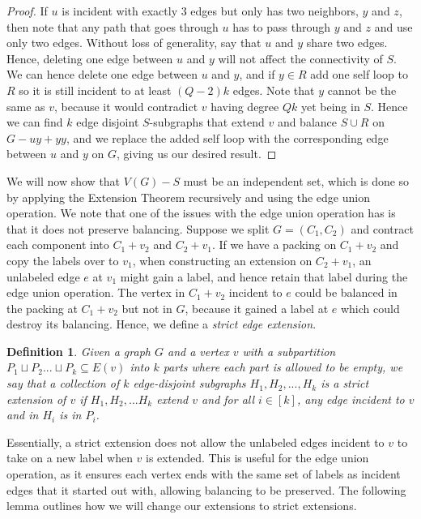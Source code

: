\documentclass{article}
\newtheorem{definition}{Definition}[section]
\begin{document}
\begin{proof}
    If $u$ is incident with exactly 3 edges but only has two neighbors, $y$ and $z$, then note that any path that goes through $u$ has to pass through $y$ and $z$ and use only two edges. Without loss of generality, say that $u$ and $y$ share two edges. Hence, deleting one edge between $u$ and $y$ will not affect the connectivity of $S$. We can hence delete one edge between $u$ and $y$, and if $y \in R$ add one self loop to $R$ so it is still incident to at least $(Q-2)k$ edges. Note that $y$ cannot be the same as $v$, because it would contradict $v$ having degree $Qk$ yet being in $S$. Hence we can find $k$ edge disjoint $S$-subgraphs that extend $v$ and balance $S \cup R$ on $G-uy+yy$, and we replace the added self loop with the corresponding edge between $u$ and $y$ on $G$, giving us our desired result. 
\end{proof}

We will now show that $V(G)-S$ must be an independent set, which is done so by applying the Extension Theorem recursively and using the edge union operation. We note that one of the issues with the edge union operation has is that it does not preserve balancing. Suppose we split $G = (C_1,C_2)$ and contract each component into $C_1+v_2$ and $C_2+v_1$. If we have a packing on $C_1+v_2$ and copy the labels over to $v_1$, when constructing an extension on $C_2+v_1$, an unlabeled edge $e$ at $v_1$ might gain a label, and hence retain that label during the edge union operation. The vertex in $C_1+v_2$ incident to $e$ could be balanced in the packing at $C_1+v_2$ but not in $G$, because it gained a label at $e$ which could destroy its balancing. Hence, we define a \emph{strict edge extension}.

\begin{definition}
    Given a graph $G$ and a vertex $v$ with a subpartition $P_1 \sqcup P_2 ... \sqcup P_k \subseteq E(v)$ into $k$ parts where each part is allowed to be empty, we say that a collection of $k$ edge-disjoint subgraphs $H_1, H_2,...,H_k$ is a strict extension of $v$ if $H_1,H_2,...H_k$ extend $v$ and for all $i \in [k]$, any edge incident to $v$ and in $H_i$ is in $P_i$. 
\end{definition}

Essentially, a strict extension does not allow the unlabeled edges incident to $v$ to take on a new label when $v$ is extended. This is useful for the edge union operation, as it ensures each vertex ends with the same set of labels as incident edges that it started out with, allowing balancing to be preserved. The following lemma outlines how we will change our extensions to strict extensions. 
\end{document}
